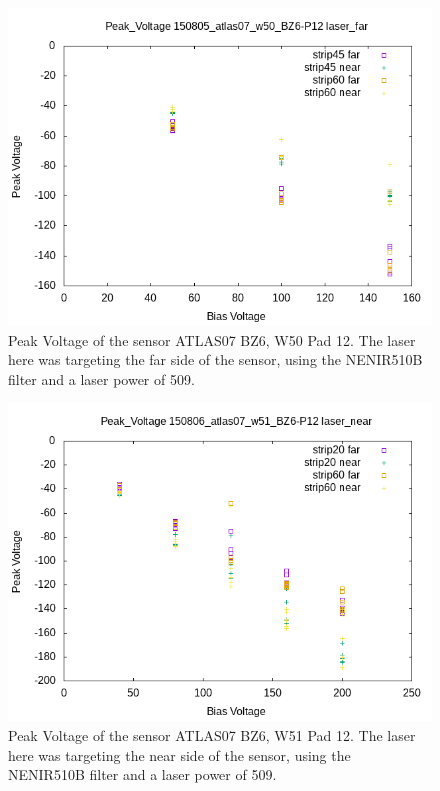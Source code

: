 \documentclass{report}
\begin{document}
            \begin{figure}[h] 
                \includegraphics[height=.4\textheight]{Peak_Voltage__150805_atlas07_w50_BZ6-P12__laser_far}
                \centering
                \caption{ Peak Voltage of the sensor ATLAS07 BZ6, W50 Pad 12. The laser here was targeting the far side of the sensor, using the NENIR510B filter and a laser power of 509. }
                \label{fig:Peak_Voltage__150805_atlas07_w50_BZ6-P12__laser_far}
            \end{figure}

            \begin{figure}[h] 
                \includegraphics[height=.4\textheight]{Peak_Voltage__150806_atlas07_w51_BZ6-P12__laser_near}
                \centering
                \caption{ Peak Voltage of the sensor ATLAS07 BZ6, W51 Pad 12. The laser here was targeting the near side of the sensor, using the NENIR510B filter and a laser power of 509. }
                \label{fig:Peak_Voltage__150806_atlas07_w51_BZ6-P12__laser_near}
            \end{figure}
\end{document}
